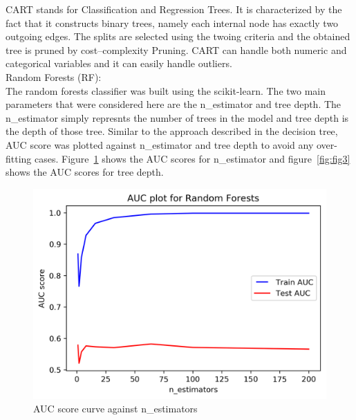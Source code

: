 CART stands for Classification and Regression Trees. It is characterized by the fact that it constructs binary trees, namely each internal node has exactly two outgoing edges. The splits are selected using the twoing criteria and the obtained tree is pruned by cost–complexity Pruning. CART can handle both numeric and categorical variables and it can easily handle outliers.
\\

Random Forests (RF): \\
The random forests classifier was built using the scikit-learn. The two main parameters that were considered here are the n\_estimator and tree depth. The n\_estimator simply represnts the number of trees in the model and tree depth is the depth of those tree. Similar to the approach described in the decision tree, AUC score was plotted against n\_estimator and tree depth to avoid any over-fitting cases. Figure~\ref{fig:fig2} shows the AUC scores for n\_estimator and figure~\ref{fig:fig3} shows the AUC scores for tree depth. 
\begin{figure}[!ht]
 \centering
\includegraphics[width=6.1in]{assignment2/1-3-RandomForests_AUC(n_estimators).png}
\caption{\label{fig:fig2}AUC score curve against n\_estimators}
\end{figure}

